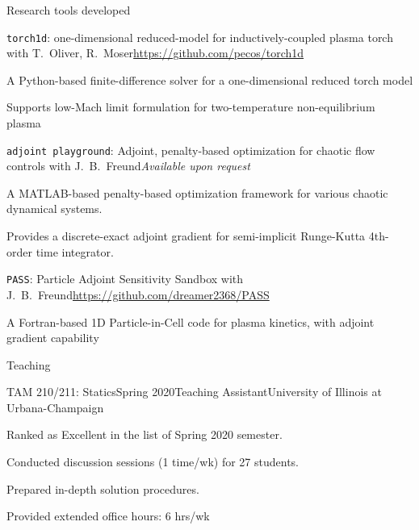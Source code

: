 \documentclass{resume} %
\begin{document}
\begin{rSection}{Research tools developed}
\begin{rSubsection}{\texttt{torch1d}: one-dimensional reduced-model for inductively-coupled plasma torch}{}
{with T.\ Oliver, R.\ Moser}{\url{https://github.com/pecos/torch1d}}
\item A Python-based finite-difference solver for a one-dimensional reduced torch model
\item Supports low-Mach limit formulation for two-temperature non-equilibrium plasma
\end{rSubsection}
\begin{rSubsection}{\texttt{adjoint playground}: Adjoint, penalty-based optimization for chaotic flow controls}{}
{with J.\ B.\ Freund}{\em Available upon request}
\item A MATLAB-based penalty-based optimization framework for various chaotic dynamical systems.
\item Provides a discrete-exact adjoint gradient for semi-implicit Runge-Kutta 4th-order time integrator.
\end{rSubsection}
\begin{rSubsection}{\texttt{PASS}: Particle Adjoint Sensitivity Sandbox}{}
{with J.\ B.\ Freund}{\url{https://github.com/dreamer2368/PASS}}
\item A Fortran-based 1D Particle-in-Cell code for plasma kinetics, with adjoint gradient capability
\end{rSubsection}
\end{rSection}





\begin{rSection}{Teaching}


\begin{rSubsection}{TAM 210/211: Statics}{Spring 2020}{Teaching Assistant}{University of Illinois at Urbana-Champaign}
\item Ranked as Excellent in the list of Spring 2020 semester.
\item Conducted discussion sessions (1 time/wk) for 27 students.
\item Prepared in-depth solution procedures.
\item Provided extended office hours: 6 hrs/wk
\end{rSubsection}


\end{rSection}
\end{document}
